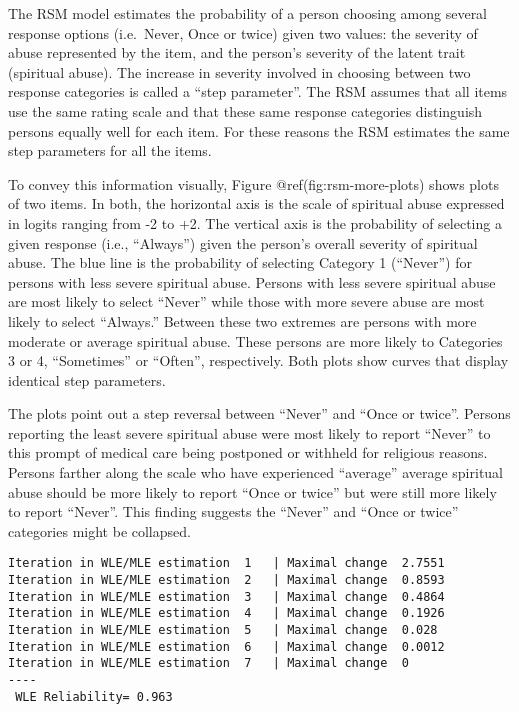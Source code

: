 \documentclass[
  letterpaper,
  DIV=11,
  numbers=noendperiod]{scrreport}
\begin{document}
The RSM model estimates the probability of a person choosing among
several response options (i.e.~Never, Once or twice) given two values:
the severity of abuse represented by the item, and the person's severity
of the latent trait (spiritual abuse). The increase in severity involved
in choosing between two response categories is called a ``step
parameter''. The RSM assumes that all items use the same rating scale
and that these same response categories distinguish persons equally well
for each item. For these reasons the RSM estimates the same step
parameters for all the items.

To convey this information visually, Figure @ref(fig:rsm-more-plots)
shows plots of two items. In both, the horizontal axis is the scale of
spiritual abuse expressed in logits ranging from -2 to +2. The vertical
axis is the probability of selecting a given response (i.e., ``Always'')
given the person's overall severity of spiritual abuse. The blue line is
the probability of selecting Category 1 (``Never'') for persons with
less severe spiritual abuse. Persons with less severe spiritual abuse
are most likely to select ``Never'' while those with more severe abuse
are most likely to select ``Always.'' Between these two extremes are
persons with more moderate or average spiritual abuse. These persons are
more likely to Categories 3 or 4, ``Sometimes'' or ``Often'',
respectively. Both plots show curves that display identical step
parameters.

The plots point out a step reversal between ``Never'' and ``Once or
twice''. Persons reporting the least severe spiritual abuse were most
likely to report ``Never'' to this prompt of medical care being
postponed or withheld for religious reasons. Persons farther along the
scale who have experienced ``average'' average spiritual abuse should be
more likely to report ``Once or twice'' but were still more likely to
report ``Never''. This finding suggests the ``Never'' and ``Once or
twice'' categories might be collapsed.

\begin{verbatim}
Iteration in WLE/MLE estimation  1   | Maximal change  2.7551 
Iteration in WLE/MLE estimation  2   | Maximal change  0.8593 
Iteration in WLE/MLE estimation  3   | Maximal change  0.4864 
Iteration in WLE/MLE estimation  4   | Maximal change  0.1926 
Iteration in WLE/MLE estimation  5   | Maximal change  0.028 
Iteration in WLE/MLE estimation  6   | Maximal change  0.0012 
Iteration in WLE/MLE estimation  7   | Maximal change  0 
----
 WLE Reliability= 0.963 
\end{verbatim}
\end{document}
